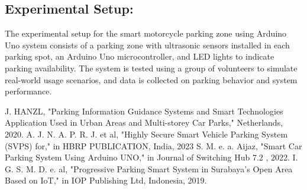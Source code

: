 \documentclass[conference]{IEEEtran}
\begin{document}
	\subsection{Experimental Setup:}
	The experimental setup for the smart motorcycle parking zone using Arduino Uno system consists of a parking zone with ultrasonic sensors installed in each parking spot, an Arduino Uno microcontroller, and LED lights to indicate parking availability. The system is tested using a group of volunteers to simulate real-world usage scenarios, and data is collected on parking behavior and system performance.
	
	
	
	

	
\begin{thebibliography}{00}
J. HANZL, "Parking Information Guidance Systems and Smart Technologies Application Used in Urban Areas and Multi-storey Car Parks," Netherlands, 2020. 
 A. J. N. A. P. R. J. et al, "Highly Secure Smart Vehicle Parking System (SVPS) for," in HBRP PUBLICATION, India, 2023 
 S. M. e. a. Aijaz, "Smart Car Parking System Using Arduino UNO," in Journal of Switching Hub 7.2 , 2022. 
	I. G. S. M. D. e. al, "Progressive Parking Smart System in Surabaya's Open Area Based on IoT," in IOP Publishing Ltd, Indonesia, 2019. 
\end{thebibliography}
\end{document}
